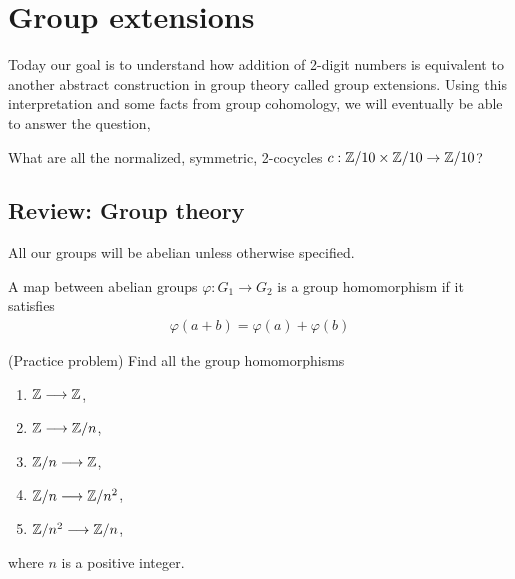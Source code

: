 \newpage
\section{Group extensions}
Today our goal is to understand how addition of 2-digit numbers is equivalent to another abstract construction in group theory called group extensions.
Using this interpretation and some facts from group cohomology, we will eventually be able to answer the question,
\begin{q*}
  What are all the normalized, symmetric, 2-cocycles $c:\mathbb{Z}/10 \times \mathbb{Z}/10 \rightarrow \mathbb{Z}/10$?
\end{q*}
\begin{mdframed}
\end{mdframed}





\subsection{Review: Group theory}
All our groups will be abelian unless otherwise specified.

A map between abelian groups $\varphi: G_1 \longrightarrow G_2$ is a group homomorphism if it satisfies
\begin{align*}
  \varphi(a + b) = \varphi(a) + \varphi(b)
\end{align*}

\begin{qbox}(Practice problem)
  \label{q:groupHomsExamples}
  Find all the group homomorphisms
  \begin{enumerate}
    \item $\mathbb{Z} \longrightarrow \mathbb{Z}$,
    \item $\mathbb{Z} \longrightarrow \mathbb{Z}/n$,
    \item $\mathbb{Z}/n \longrightarrow \mathbb{Z}$,
    \item $\mathbb{Z}/n \longrightarrow \mathbb{Z}/n^2$,
    \item $\mathbb{Z}/n^2 \longrightarrow \mathbb{Z}/n$,
  \end{enumerate}
  where $n$ is a positive integer.
\end{qbox}

